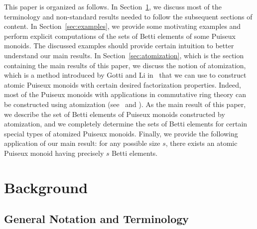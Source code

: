 \documentclass[12pt]{amsart}
\theoremstyle{definition}
\numberwithin{equation}{section}
\begin{document}
This paper is organized as follows. In Section~\ref{sec:background}, we discuss most of the terminology and non-standard results needed to follow the subsequent sections of content. In Section~\ref{sec:examples}, we provide some motivating examples and perform explicit computations of the sets of Betti elements of some Puiseux monoids. The discussed examples should provide certain intuition to better understand our main results. In Section~\ref{sec:atomization}, which is the section containing the main results of this paper, we discuss the notion of atomization, which is a method introduced by Gotti and Li in~\cite{GL23} that we can use to construct atomic Puiseux monoids with certain desired factorization properties. Indeed, most of the Puiseux monoids with applications in commutative ring theory can be constructed using atomization (see~\cite{aG74} and \cite{GL23}). As the main result of this paper, we describe the set of Betti elements of Puiseux monoids constructed by atomization, and we completely determine the sets of Betti elements for certain special types of atomized Puiseux monoids. Finally, we provide the following application of our main result: for any possible size $s$, there exists an atomic Puiseux monoid having precisely $s$ Betti elements.












\bigskip
\section{Background}
\label{sec:background}


\medskip
\subsection{General Notation and Terminology} 
\end{document}
